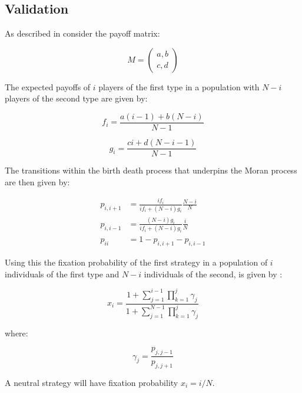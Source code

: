 \documentclass[10pt,letterpaper]{article}
\begin{document}
\subsection*{Validation}

As described in \cite{Nowak} consider the payoff matrix:

\begin{equation}\label{equ:payoff_matrix}
    M = \begin{pmatrix}
        a, b\\
        c, d
        \end{pmatrix}
\end{equation}

The expected payoffs of \(i\) players of the first type in a population with \(N
- i\) players of the second type are given by:

\begin{equation}\label{equ:expected_payoff_one}
    f_i = \frac{a(i - 1) + b(N - i)}{N - 1}
\end{equation}

\begin{equation}\label{equ:expected_payoff_two}
    g_i = \frac{ci + d(N - i - 1)}{N - 1}
\end{equation}

The transitions within the birth death process that underpins the Moran process
are then given by:

\begin{align}
    p_{i, i+1}&= \frac{if_i}{if_i+(N-i)g_i}\frac{N-i}{N}\label{equ:p_up}\\
    p_{i, i-1}&= \frac{(N-i)g_i}{if_i+(N-i)g_i}\frac{i}{N}\label{equ:p_down}\\
    p_{ii} &= 1 - p_{i, i+1} - p_{i, i-1}\label{equ:p_stay}
\end{align}

Using this the fixation probability
of the first strategy in a population of \(i\) individuals of the first type
and \(N-i\) individuals of the second, is given by \cite{Nowak2017}:

\begin{equation}\label{equ:fixation_probability}
x_i = \frac{1 + \sum_{j=1}^{i-1}\prod_{k=1}^{j}\gamma_j}{1 + \sum_{j=1}^{N-1}
      \prod_{k=1}^{j}\gamma_j}
\end{equation}

where:

\[
\gamma_j = \frac{p_{j, j-1}}{p_{j, j+1}}
\]

A neutral strategy will have fixation probability $x_i = i/N$.
\end{document}
